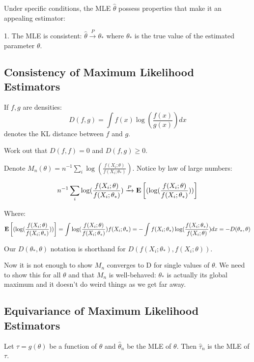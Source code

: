 \documentclass[10pt]{article}
\begin{document}
Under specific conditions, the MLE $\hat{\theta}$ possess properties that make it an appealing
estimator:

1. The MLE is consistent: $\hat{\theta} \xrightarrow{P} \theta_*$
where $\theta_*$ is the true value of the estimated parameter $\theta$.

\subsection{Consistency of Maximum Likelihood Estimators}

\begin{definition}
    If $f, g$ are densities:
    \[ D(f, g) = \int f(x) \log(\frac{f(x)}{g(x)}) dx\]
    denotes the KL distance between $f$ and $g$.
\end{definition}

Work out that $D(f, f) = 0$ and $D(f, g) \geq 0$.

Denote $M_n(\theta) = n^{-1} \sum_i \log(\frac{f(X_i;\theta)}{f(X_i;\theta_*)})$. Notice by law of large numbers:

\[ n^{-1} \sum_i \log(\frac{f(X_i;\theta)}{f(X_i;\theta_*)}) \xrightarrow{P} \operatorname{\mathbf{E}}\left[(\log(\frac{f(X_i;\theta)}{f(X_i;\theta_*)}))\right] \]

Where:
\[ \operatorname{\mathbf{E}}\left[(\log(\frac{f(X_i;\theta)}{f(X_i;\theta_*)}))\right] = \int
\log(\frac{f(X_i;\theta)}{f(X_i;\theta_*)}) f(X_i;\theta_*) = - \int
f(X_i;\theta_*) \log(\frac{f(X_i;\theta_*)}{f(X_i;\theta)}) dx = -D(\theta_*,
\theta)\]

\begin{note}
    Our $D(\theta_*, \theta)$ notation is shorthand for $D(f(X_i;\theta_*),
    f(X_i;\theta))$.
\end{note}

Now it is not enough to show $M_n$ converges to D for single values of
$\theta$. We need to show this for all $\theta$ and that $M_n$ is well-behaved: $\theta_*$ is actually
its global maximum and it doesn't do weird things as we get far away.

\begin{theorem}
\end{theorem}

\subsection{Equivariance of Maximum Likelihood Estimators}

\begin{theorem}[Equivariance]
    Let $\tau = g(\theta)$ be a function of $\theta$ and $\hat{\theta}_n$ be
    the MLE of $\theta$. Then $\hat{\tau}_n$ is the MLE of $\tau$.
\end{theorem}
\end{document}
